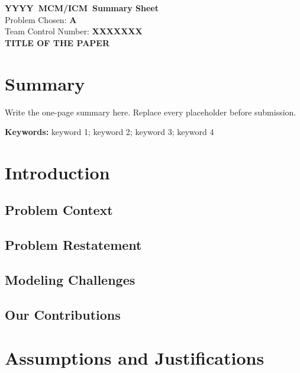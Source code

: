 \documentclass[11pt,letterpaper]{article}
\newcommand{\ContestName}{MCM/ICM}
\newcommand{\ContestYear}{YYYY}
\newcommand{\ProblemCode}{A}
\newcommand{\TeamNumber}{XXXXXXX}
\newcommand{\PaperTitle}{TITLE OF THE PAPER}
\begin{document}
\begin{titlepage}
\begin{center}
\vspace*{1.2cm}
{\LARGE\bfseries \ContestYear\ \ContestName\ Summary Sheet}\\[0.8cm]
{\large Problem Chosen: \textbf{\ProblemCode}}\\[0.4cm]
{\large Team Control Number: \textbf{\TeamNumber}}\\[1.5cm]
{\Huge\bfseries \PaperTitle}\\[1.5cm]
\end{center}

\section*{Summary}
Write the one-page summary here. Replace every placeholder before submission.

\vfill
\noindent\textbf{Keywords:} keyword 1; keyword 2; keyword 3; keyword 4
\end{titlepage}

\tableofcontents
\newpage

\section{Introduction}
\subsection{Problem Context}
\subsection{Problem Restatement}
\subsection{Modeling Challenges}
\subsection{Our Contributions}

\section{Assumptions and Justifications}
\end{document}
